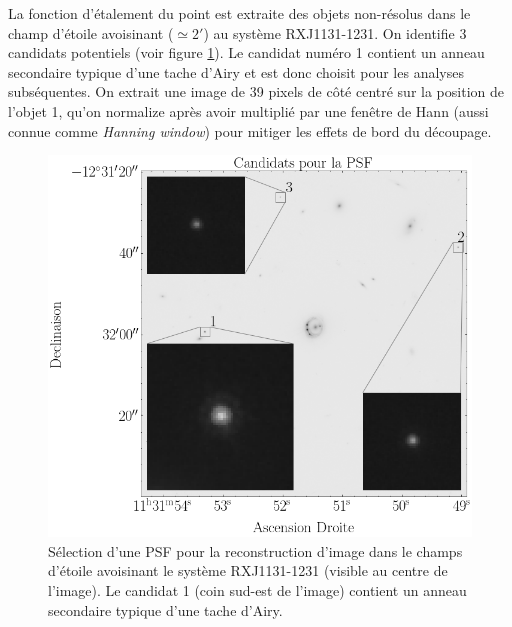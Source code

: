 \documentclass[times,10pt,twocolumn]{article}
\begin{document}
La fonction d'étalement du point est extraite des objets non-résolus dans le
champ d'étoile 
avoisinant ($\simeq 2'$) au système RXJ1131-1231. 
On identifie 3 candidats potentiels (voir figure \ref{fig:psf}). 
Le candidat numéro 1 contient un anneau secondaire 
typique d'une tache d'Airy et est donc choisit pour les analyses subséquentes. 
On extrait une image de 39 pixels de côté centré sur la position de l'objet 1, 
qu'on normalize 
après avoir 
multiplié par une fenêtre de Hann (aussi connue comme \textit{Hanning window})
pour mitiger les effets de bord du découpage.

\begin{figure}[H]
        \centering
        \includegraphics[width=\linewidth]{psf_cutout}
        \caption{ Sélection d'une PSF pour la reconstruction d'image dans le champs 
                d'étoile avoisinant le système RXJ1131-1231 (visible au centre 
                de l'image). Le candidat 1 (coin sud-est de l'image) contient 
                un anneau secondaire typique d'une tache d'Airy.
        }
        \label{fig:psf}
\end{figure}
\end{document}
